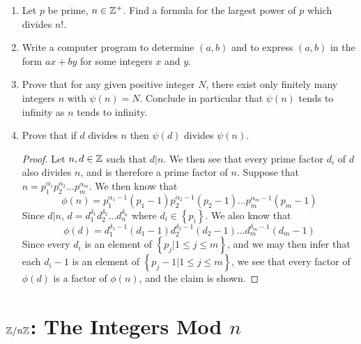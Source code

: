 \begin{enumerate}
\begin{proof}
		Since the qotient $a^2/b^2$ is prime, every prime factor of $b^2$ must be a factor of $a^2$.
		
		There are an even number of such factors, and since $a\neq b$ and $a^2/b^2>1$ there must be a greater (even) number of prime factors of $a^2$.  This implies that the prime factorization of $a^2$ contains at least two factors, so $p$ cannot be prime.  This contradiction proves the claim.
	\end{proof}
	
	 \item Let $p$ be prime, $n\in \mathbb{Z}^+$.  Find a formula for the largest power of $p$ which divides $n!$.
	 
	 \item Write a computer program to determine $(a,b)$ and to express $(a,b)$ in the form $ax+by$ for some integers $x$ and $y$.
	 \item Prove that for any given positive integer $N$, there exist only finitely many integers $n$ with $\psi(n)= N$.  Conclude in particular that $\psi(n)$ tends to infinity as $n$ tends to infinity.
	 \item Prove that if $d$ divides $n$ then $\psi(d)$ divides $\psi(n)$.
	 
	 \begin{proof}
	 	Let $n,d\in\mathbb{Z}$ such that $d|n$.  We then see that every prime factor $d_i$ of $d$ also divides $n$, and is therefore a prime factor of $n$.  Suppose that $n = p_1^{\alpha_1}p_2^{\alpha_2}...p_m^{\alpha_m}$.  We then know that $$\phi(n) = p_{1}^{\alpha_1-1}(p_1-1)p_{2}^{\alpha_2-1}(p_2-1)...p_{m}^{\alpha_m-1}(p_m-1)$$
	 	Since $d|n$, $d = d_1^{\delta_1}d_2^{\delta_2}...d_n^{\delta_n}$ where $d_i\in\left\{p_i\right\}$.
	 	We also know that
	 	$$\phi(d) = d_{1}^{\delta_1-1}(d_1-1)d_{2}^{\delta_2-1}(d_2-1)...d_{m}^{\delta_m-1}(d_m-1)$$ 
	 	Since every $d_i$ is an element of $\left\{ p_j | 1\leq j \leq m\right\}$, and we may then infer that each $d_i-1$ is an element of $\left\{ p_j-1 | 1\leq j \leq m \right\}$, we see that every factor of $\phi(d)$ is a factor of $\phi(n)$, and the claim is shown.
	 \end{proof}
\end{enumerate}

\section{$\mathbb{Z}/n\mathbb{Z}$: The Integers Mod $n$}

